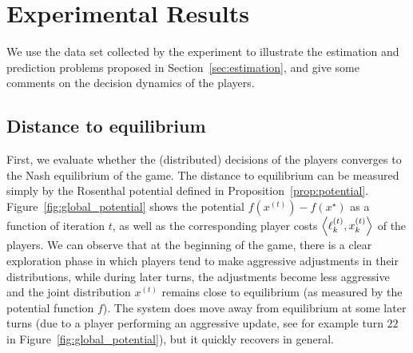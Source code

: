 \documentclass{sig-alternate-ipsn13}
\begin{document}
\section{Experimental Results}
\label{sec:results}
We use the data set collected by the experiment to illustrate the estimation and prediction problems proposed in Section~\ref{sec:estimation}, and give some comments on the decision dynamics of the players.
\subsection{Distance to equilibrium}
First, we evaluate whether the (distributed) decisions of the players converges to the Nash equilibrium of the game. The distance to equilibrium can be measured simply by the Rosenthal potential defined in Proposition~\ref{prop:potential}. Figure~\ref{fig:global_potential} shows the potential $f(x^{(t)}) - f(x^\star)$ as a function of iteration $t$, as well as the corresponding player costs $\left\langle \ell^{(t)}_k, x^{(t)}_k \right\rangle$ of the players. We can observe that at the beginning of the game, there is a clear exploration phase in which players tend to make aggressive adjustments in their distributions, while during later turns, the adjustments become less aggressive and the joint distribution $x^{(t)}$ remains close to equilibrium (as measured by the potential function $f$). The system does move away from equilibrium at some later turns (due to a player performing an aggressive update, see for example turn $22$ in Figure~\ref{fig:global_potential}), but it quickly recovers in general.


\end{document}
